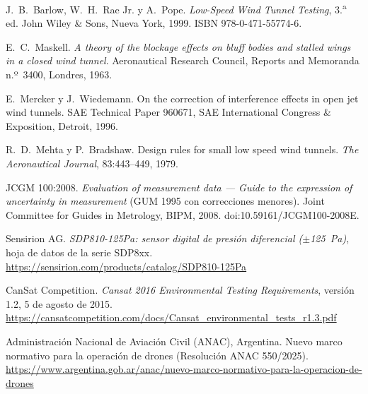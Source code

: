  J.~B.~Barlow, W.~H.~Rae Jr. y A.~Pope. \emph{Low-Speed Wind
  Tunnel Testing}, 3.\textsuperscript{a} ed. John Wiley \& Sons, Nueva York, 1999.
  ISBN 978-0-471-55774-6.

 E.~C.~Maskell. \emph{A theory of the blockage effects on
  bluff bodies and stalled wings in a closed wind tunnel}. Aeronautical Research Council,
  Reports and Memoranda n.º~3400, Londres, 1963.

 E.~Mercker y J.~Wiedemann. On the correction of interference
  effects in open jet wind tunnels. SAE Technical Paper 960671, SAE International Congress
  \& Exposition, Detroit, 1996.

 R.~D.~Mehta y P.~Bradshaw. Design rules for small low speed
  wind tunnels. \emph{The Aeronautical Journal}, 83:443--449, 1979.

 JCGM 100:2008. \emph{Evaluation of measurement data --- Guide
  to the expression of uncertainty in measurement} (GUM 1995 con correcciones menores).
  Joint Committee for Guides in Metrology, BIPM, 2008. doi:10.59161/JCGM100-2008E.

 Sensirion AG. \emph{SDP810-125Pa: sensor digital de presión
  diferencial ($\pm$125~Pa)}, hoja de datos de la serie SDP8xx.
  \url{https://sensirion.com/products/catalog/SDP810-125Pa}

 CanSat Competition. \emph{Cansat 2016 Environmental Testing
  Requirements}, versión 1.2, 5 de agosto de 2015.
  \url{https://cansatcompetition.com/docs/Cansat_environmental_tests_r1.3.pdf}

 Administración Nacional de Aviación Civil (ANAC), Argentina.
  Nuevo marco normativo para la operación de drones (Resolución ANAC 550/2025).
  \url{https://www.argentina.gob.ar/anac/nuevo-marco-normativo-para-la-operacion-de-drones}
